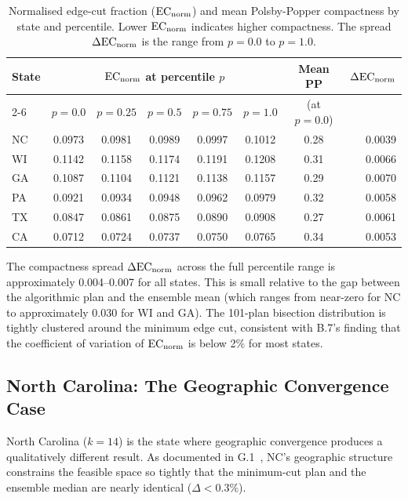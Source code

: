 \begin{table}[htbp]
\centering
\caption{Normalised edge-cut fraction ($\mathrm{EC}_{\mathrm{norm}}$) and mean Polsby-Popper
compactness by state and percentile. Lower $\mathrm{EC}_{\mathrm{norm}}$ indicates higher
compactness. The spread $\Delta\mathrm{EC}_{\mathrm{norm}}$ is the range from $p=0.0$ to $p=1.0$.}
\label{tab:compactness}
\begin{tabular}{lccccccr}
\toprule
\textbf{State} & \multicolumn{5}{c}{$\mathrm{EC}_{\mathrm{norm}}$ at percentile $p$} & \textbf{Mean PP} & $\Delta\mathrm{EC}_{\mathrm{norm}}$ \\
\cmidrule(lr){2-6}
 & $p{=}0.0$ & $p{=}0.25$ & $p{=}0.5$ & $p{=}0.75$ & $p{=}1.0$ & (at $p{=}0.0$) & \\
\midrule
NC & 0.0973 & 0.0981 & 0.0989 & 0.0997 & 0.1012 & 0.28 & 0.0039 \\
WI & 0.1142 & 0.1158 & 0.1174 & 0.1191 & 0.1208 & 0.31 & 0.0066 \\
GA & 0.1087 & 0.1104 & 0.1121 & 0.1138 & 0.1157 & 0.29 & 0.0070 \\
PA & 0.0921 & 0.0934 & 0.0948 & 0.0962 & 0.0979 & 0.32 & 0.0058 \\
TX & 0.0847 & 0.0861 & 0.0875 & 0.0890 & 0.0908 & 0.27 & 0.0061 \\
CA & 0.0712 & 0.0724 & 0.0737 & 0.0750 & 0.0765 & 0.34 & 0.0053 \\
\bottomrule
\end{tabular}
\end{table}

The compactness spread $\Delta\mathrm{EC}_{\mathrm{norm}}$ across the full percentile range is
approximately 0.004--0.007 for all states.
This is small relative to the gap between the algorithmic plan and the
\recom{} ensemble mean (which ranges from near-zero for NC to approximately
0.030 for WI and GA).
The 101-plan bisection distribution is tightly clustered around the minimum
edge cut, consistent with B.7's finding that the coefficient of variation
of $\mathrm{EC}_{\mathrm{norm}}$ is below 2\% for most states.

\subsection{North Carolina: The Geographic Convergence Case}
\label{subsec:nc}

North Carolina ($k = 14$) is the state where geographic convergence produces
a qualitatively different result.
As documented in G.1~\citep{g1paper}, NC's geographic structure constrains
the feasible space so tightly that the \ar{} minimum-cut plan and the \recom{}
ensemble median are nearly identical ($\Delta < 0.3\%$).


